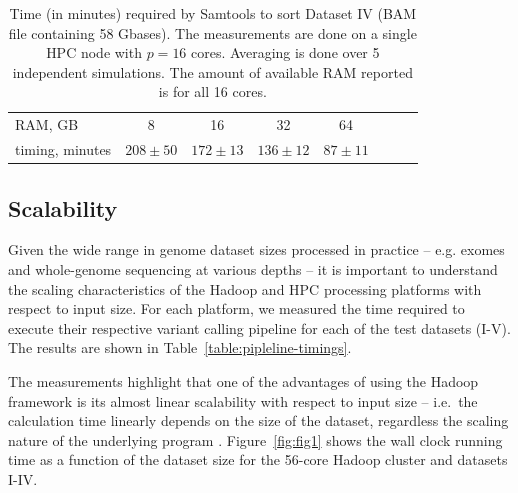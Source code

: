 \documentclass{bioinfo}
\begin{document}
 \begin{table}[hbtp]
\small

\caption{%
	Time (in minutes) required by Samtools to sort
	Dataset IV (BAM file containing 58 Gbases). The measurements are done on a single HPC
	node with $p=16$ cores. Averaging is done over 5 independent simulations. The
	amount of available RAM reported is for all 16 cores.
}
\begin{center}
\begin{tabular}{|l|c|c|c|c|c|c|c|}
RAM, GB		&	8			&		16			&			32		& 		64				\\
timing, minutes	&	$208\pm50$	&	$172\pm13$		&	$136\pm12$		& 	$87\pm11$			\\
\end{tabular}
\end{center}
\label{table:samtools-sort}
\normalsize
\end{table}%








\subsection*{Scalability}
Given the wide range in genome dataset sizes processed in practice -- e.g.
exomes and whole-genome sequencing at various depths -- it is
important to understand the scaling characteristics of the Hadoop and HPC processing
platforms with respect to input size. For each platform, we
measured the time required to execute their respective variant calling
pipeline for each of the test datasets (I-V). The results are
shown in Table~\ref{table:pipleline-timings}.

The measurements highlight that one of the advantages of using the Hadoop framework is
its almost linear scalability with respect to input size -- i.e.\ the
calculation time linearly depends on the size of the
dataset, regardless the scaling nature of the underlying program \citep{Langmead:2009kx,Pireddu:2011vn}.
Figure~\ref{fig:fig1} shows the wall clock
running time as a function of the dataset size for the 56-core Hadoop cluster and datasets
I-IV.
\end{document}
